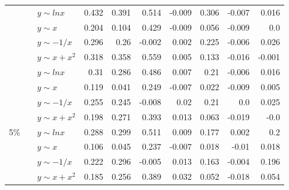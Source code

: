 \begin{table*}[!ht]
\begin{tabular}{| l | l | l | r | r | r | r | r | r | r | }
&\multirow{4}{*}{\metrictwok{}}
&$y\sim lnx$&\cellcolor[rgb]{.7,.7,.7}0.432&\cellcolor[rgb]{.7,.7,.7}0.391&\cellcolor[rgb]{.5,.5,.5}0.514&-0.009&\cellcolor[rgb]{.7,.7,.7}0.306&-0.007&\cellcolor[rgb]{.9,.9,.9}0.016  \\ \cline{3-10}
&&$y\sim x$&\cellcolor[rgb]{.9,.9,.9}0.204&\cellcolor[rgb]{.9,.9,.9}0.104&\cellcolor[rgb]{.7,.7,.7}0.429&-0.009&\cellcolor[rgb]{.9,.9,.9}0.056&-0.009&0.0  \\ \cline{3-10}
&&$y\sim -1/x$&\cellcolor[rgb]{.7,.7,.7}0.296&\cellcolor[rgb]{.7,.7,.7}0.26&-0.002&\cellcolor[rgb]{.9,.9,.9}0.002&\cellcolor[rgb]{.9,.9,.9}0.225&-0.006&\cellcolor[rgb]{.9,.9,.9}0.026  \\ \cline{3-10}
&&$y\sim x+x^2$&\cellcolor[rgb]{.7,.7,.7}0.318&\cellcolor[rgb]{.7,.7,.7}0.358&\cellcolor[rgb]{.5,.5,.5}0.559&\cellcolor[rgb]{.9,.9,.9}0.005&\cellcolor[rgb]{.9,.9,.9}0.133&-0.016&-0.001  \\ \cline{2-10}

&\multirow{4}{*}{\metrictwop{}}
&$y\sim lnx$&\cellcolor[rgb]{.7,.7,.7}0.31&\cellcolor[rgb]{.7,.7,.7}0.286&\cellcolor[rgb]{.7,.7,.7}0.486&\cellcolor[rgb]{.9,.9,.9}0.007&\cellcolor[rgb]{.9,.9,.9}0.21&-0.006&\cellcolor[rgb]{.9,.9,.9}0.016  \\ \cline{3-10}
&&$y\sim x$&\cellcolor[rgb]{.9,.9,.9}0.119&\cellcolor[rgb]{.9,.9,.9}0.041&\cellcolor[rgb]{.9,.9,.9}0.249&-0.007&\cellcolor[rgb]{.9,.9,.9}0.022&-0.009&\cellcolor[rgb]{.9,.9,.9}0.005  \\ \cline{3-10}
&&$y\sim -1/x$&\cellcolor[rgb]{.7,.7,.7}0.255&\cellcolor[rgb]{.9,.9,.9}0.245&-0.008&\cellcolor[rgb]{.9,.9,.9}0.02&\cellcolor[rgb]{.9,.9,.9}0.21&0.0&\cellcolor[rgb]{.9,.9,.9}0.025  \\ \cline{3-10}
&&$y\sim x+x^2$&\cellcolor[rgb]{.9,.9,.9}0.198&\cellcolor[rgb]{.7,.7,.7}0.271&\cellcolor[rgb]{.7,.7,.7}0.393&\cellcolor[rgb]{.9,.9,.9}0.013&\cellcolor[rgb]{.9,.9,.9}0.063&-0.019&-0.0  \\ \hline

\multirow{16}{*}{5\%}

&\multirow{4}{*}{\metricone{}}
&$y\sim lnx$&\cellcolor[rgb]{.7,.7,.7}0.288&\cellcolor[rgb]{.7,.7,.7}0.299&\cellcolor[rgb]{.5,.5,.5}0.511&\cellcolor[rgb]{.9,.9,.9}0.009&\cellcolor[rgb]{.9,.9,.9}0.177&\cellcolor[rgb]{.9,.9,.9}0.002&\cellcolor[rgb]{.9,.9,.9}0.2  \\ \cline{3-10}
&&$y\sim x$&\cellcolor[rgb]{.9,.9,.9}0.106&\cellcolor[rgb]{.9,.9,.9}0.045&\cellcolor[rgb]{.9,.9,.9}0.237&-0.007&\cellcolor[rgb]{.9,.9,.9}0.018&-0.01&\cellcolor[rgb]{.9,.9,.9}0.018  \\ \cline{3-10}
&&$y\sim -1/x$&\cellcolor[rgb]{.9,.9,.9}0.222&\cellcolor[rgb]{.7,.7,.7}0.296&-0.005&\cellcolor[rgb]{.9,.9,.9}0.013&\cellcolor[rgb]{.9,.9,.9}0.163&-0.004&\cellcolor[rgb]{.9,.9,.9}0.196  \\ \cline{3-10}
&&$y\sim x+x^2$&\cellcolor[rgb]{.9,.9,.9}0.185&\cellcolor[rgb]{.7,.7,.7}0.256&\cellcolor[rgb]{.7,.7,.7}0.389&\cellcolor[rgb]{.9,.9,.9}0.032&\cellcolor[rgb]{.9,.9,.9}0.052&-0.018&\cellcolor[rgb]{.9,.9,.9}0.054  \\ \cline{2-10}


\end{tabular}
\end{table*}
